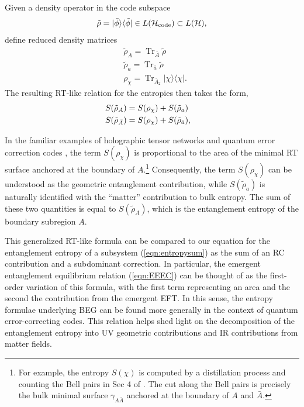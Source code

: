 \documentclass[%
preprint,
nofootinbib,
amsmath,amssymb,
aps,
prd,
showpacs,
superscriptaddress
]{revtex4-1}
\DeclareMathOperator{\Tr}{Tr}
\begin{document}
Given a density operator in the code subspace
\begin{equation}
\tilde{\rho}=|\tilde{\phi}\rangle\langle\tilde{\phi}|\in L(\mathcal{H}_{\rm code})\subset L(\mathcal{H}),
\end{equation}
define  reduced density matrices
\begin{align}
&\tilde{\rho}_A = \Tr_{\bar{A}}\tilde{\rho}\\
&\tilde{\rho}_a = \Tr_{\bar{a}}\tilde{\rho}\\
&\rho_{\chi} = \Tr_{\bar{A}_2}|\chi\rangle\langle\chi|.
\end{align}
The resulting RT-like relation for the entropies then takes the form,
\begin{align}
 S(\tilde{\rho}_{A}) &= S(\rho_{\chi})+S(\tilde{\rho}_a)\cr
 S(\tilde{\rho}_{\bar{A}}) &= S(\rho_{\chi})+S(\tilde{\rho}_{\bar{a}}),
\label{eqn:QECCRT}
\end{align}

In the familiar examples of holographic tensor networks and quantum error correction codes \cite{Pastawski:2015qua,Hayden:2016cfa}, the term $S(\rho_{\chi})$ is proportional to the area of the minimal RT surface anchored at the boundary of $A$.\footnote{For example, the entropy $S(\chi)$ is computed by a distillation process and counting the Bell pairs in Sec 4 of  \cite{Pastawski:2015qua}. The cut along the Bell pairs is precisely the bulk minimal surface $\gamma_{A\bar{A}}$ anchored at the boundary of $A$ and $\bar{A}$.}
Consequently, the term $S(\rho_\chi)$ can be understood as the geometric entanglement contribution, while $S(\tilde{\rho}_{a})$ is naturally identified with the ``matter'' contribution to bulk entropy. The sum of these two quantities is equal to $S(\tilde{\rho}_A)$, which is the entanglement entropy of the boundary subregion $A$. 

This generalized RT-like formula can be compared to our equation for the entanglement entropy of a subsystem (\ref{eqn:entropysum}) as the sum of an RC contribution and a subdominant correction.
In particular, the emergent entanglement equilibrium relation (\ref{eqn:EEEC}) can be thought of as the first-order variation of this formula, with the first term representing an area and the second the contribution from the emergent EFT.
In this sense, the entropy formulae underlying BEG can be found more generally in the context of quantum error-correcting codes.
This relation helps shed light on the decomposition of the entanglement entropy into UV geometric contributions and IR contributions from matter fields.
\end{document}
